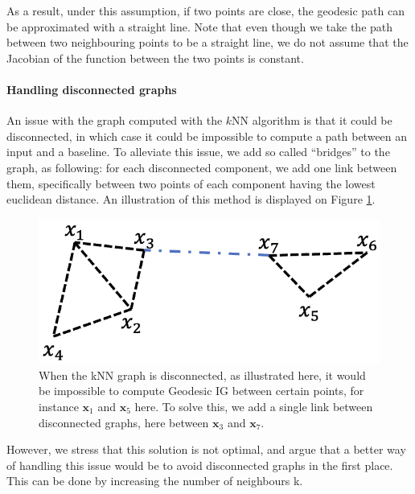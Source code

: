 As a result, under this assumption, if two points are close, the geodesic path can be approximated with a straight line. Note that even though we take the path between two neighbouring points to be a straight line, we do not assume that the Jacobian of the function between the two points is constant. 

\paragraph{Handling disconnected graphs}

An issue with the graph computed with the $k$NN algorithm is that it could be disconnected, in which case it could be impossible to compute a path between an input and a baseline. To alleviate this issue, we add so called ``bridges'' to the graph, as following: for each disconnected component, we add one link between them, specifically between two points of each component having the lowest euclidean distance. An illustration of this method is displayed on Figure \ref{fig:bridge}.

\begin{figure}[ht]
\vskip 0.2in
\begin{center}
\centerline{\includegraphics[width=0.8\columnwidth]{figures/bridge.png}}
\caption{When the kNN graph is disconnected, as illustrated here, it would be impossible to compute Geodesic IG between certain points, for instance $\textbf{x}_1$ and $\textbf{x}_5$ here. To solve this, we add a single link between disconnected graphs, here between $\textbf{x}_3$ and $\textbf{x}_7$.}
\label{fig:bridge}
\end{center}
\vskip -0.2in
\end{figure}

However, we stress that this solution is not optimal, and argue that a better way of handling this issue would be to avoid disconnected graphs in the first place. This can be done by increasing the number of neighbours k.

